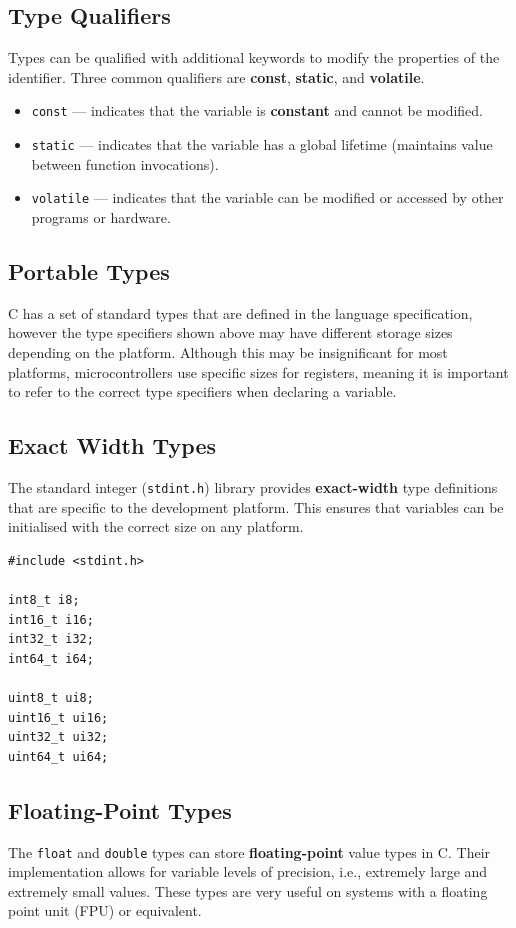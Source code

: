 \documentclass{report}
\begin{document}
\subsection{Type Qualifiers}
Types can be qualified with additional keywords to modify the properties of
the identifier. Three common qualifiers are \textbf{const}, \textbf{static}, and \textbf{volatile}.
\begin{itemize}
    \item \texttt{const} --- indicates that the variable is \textbf{constant} and cannot be modified.
    \item \texttt{static} --- indicates that the variable has a global lifetime (maintains value between function invocations).
    \item \texttt{volatile} --- indicates that the variable can be modified or accessed by other programs or hardware.
\end{itemize}
\subsection{Portable Types}
C has a set of standard types that are defined in the language specification,
however the type specifiers shown above may have different storage sizes depending on the platform.
Although this may be insignificant for most platforms, microcontrollers
use specific sizes for registers, meaning it is important to refer to the correct
type specifiers when declaring a variable.
\subsection{Exact Width Types}\label{sec:exact_width_types}
The standard integer (\texttt{stdint.h}) library provides \textbf{exact-width} type definitions that are specific to
the development platform. This ensures that variables can be initialised with the correct size on any platform.
\begin{verbatim}
#include <stdint.h>

int8_t i8;
int16_t i16;
int32_t i32;
int64_t i64;

uint8_t ui8;
uint16_t ui16;
uint32_t ui32;
uint64_t ui64;
\end{verbatim}
\subsection{Floating-Point Types}
The \texttt{float} and \texttt{double} types can store \textbf{floating-point} value types in C.
Their implementation allows for variable levels of precision, i.e., extremely large and extremely small values.
These types are very useful on systems with a floating point unit (FPU) or equivalent.
\end{document}
